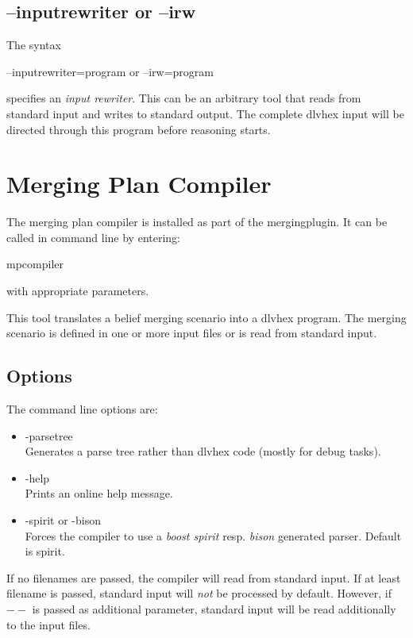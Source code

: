 \documentclass[a4paper,11pt]{article}
\theoremstyle{definition}
\newcommand{\dlvhex}{\textsf{dlvhex}\xspace }
\newcommand{\inlinecode}[1]{\textsf{#1}\xspace }
\begin{document}
			
		\subsection{\inlinecode{--inputrewriter} or \inlinecode{--irw}}

			The syntax
			\begin{center}
				\inlinecode{--inputrewriter=program} or \inlinecode{--irw=program}
			\end{center}
			specifies an \emph{input rewriter}. This can be an arbitrary tool that reads from standard input and writes to standard output. The complete \dlvhex input will be
			directed through this program before reasoning starts.

			
	\section{Merging Plan Compiler}
	\label{sec:RPCompiler}
	
		The merging plan compiler is installed as part of the mergingplugin. It can be called in command line by entering:
		\begin{center}
			\inlinecode{mpcompiler}
		\end{center}
		with appropriate parameters.

		This tool translates a belief merging scenario into a \dlvhex program. The merging scenario is defined in one or more input files or is read from standard input.
		

		\subsection{Options}
		\label{sec:RPCompiler:Options}

			The command line options are:
			\begin{itemize}
				\item \inlinecode{-parsetree} \\
						Generates a parse tree rather than dlvhex code (mostly for debug tasks).
				\item \inlinecode{-help} \\
						Prints an online help message.
				\item \inlinecode{-spirit} or \inlinecode{-bison} \\
						Forces the compiler to use a \emph{boost spirit} resp. \emph{bison} generated parser. Default is spirit.
			\end{itemize}

			If no filenames are passed, the compiler will read from standard input. If at least filename is passed, standard input will \emph{not} be processed by default.
			However, if $--$ is passed as additional parameter, standard input will be read additionally to the input files.
\end{document}
